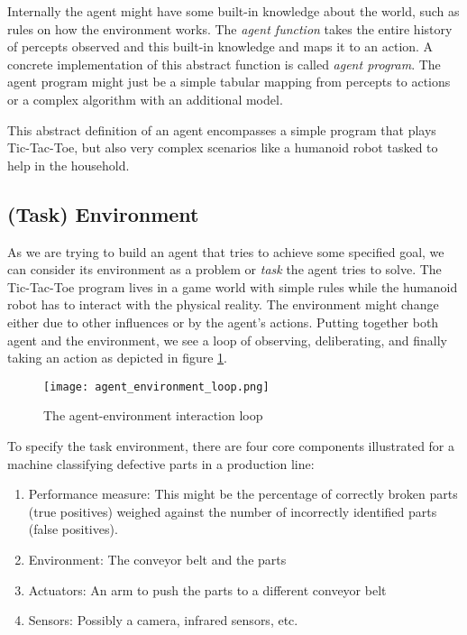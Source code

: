 Internally the agent might have some built-in knowledge about the world, such as rules on how the environment works. The \textit{agent function} takes the entire history of percepts observed and this built-in knowledge and maps it to an action. A concrete implementation of this abstract function is called \textit{agent program}. The agent program might just be a simple tabular mapping from percepts to actions or a complex algorithm with an additional model.

This abstract definition of an agent encompasses a simple program that plays Tic-Tac-Toe, but also very complex scenarios like a humanoid robot tasked to help in the household.

\subsection{(Task) Environment}
\label{environment}

As we are trying to build an agent that tries to achieve some specified goal, we can consider its environment as a problem or \textit{task} the agent tries to solve. The Tic-Tac-Toe program lives in a game world with simple rules while the humanoid robot has to interact with the physical reality. The environment might change either due to other influences or by the agent's actions. Putting together both agent and the environment, we see a loop of observing, deliberating, and finally taking an action as depicted in figure \ref{agent_environment_loop}.

\begin{figure}
    \centering
    \texttt{[image: agent\_environment\_loop.png]}
    \caption{The agent-environment interaction loop \cite[cf. p. 96]{russell_artificial_2021}}
    \label{agent_environment_loop}
\end{figure}

To specify the task environment, there are four core components illustrated for a machine classifying defective parts in a production line:

\begin{enumerate}
    \item Performance measure: This might be the percentage of correctly broken parts (true positives) weighed against the number of incorrectly identified parts (false positives).
    \item Environment: The conveyor belt and the parts
    \item Actuators: An arm to push the parts to a different conveyor belt
    \item Sensors: Possibly a camera, infrared sensors, etc.
\end{enumerate}

